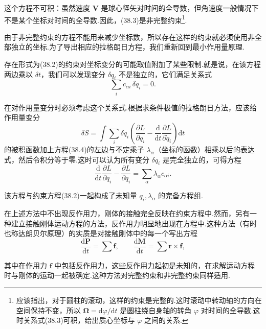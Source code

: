 这个方程不可积：虽然速度 $\boldsymbol{V}$ 是球心径矢对时间的全导数，但角速度一般情况下不是某个坐标对时间的全导数.因此，(38.3)是非完整约束\footnote{应该指出，对于圆柱的滚动，这样的约束是完整的.这时滚动中转动轴的方向在空间保持不变，所以 $\boldsymbol{\Omega}=\mathrm{d}\varphi/\mathrm{d}t$ 是圆柱绕自身轴的转角 $\varphi$ 对时间的全导数.这时关系式(38.3)可积，给出质心坐标与 $\varphi$ 之间的关系.}.

由于非完整约束的方程不能用来减少坐标数，所以存在这样的约束就必须使用非全部独立的坐标.为了导出相应的拉格朗日方程，我们重新回到最小作用量原理.

存在形式为(38.2)的约束对坐标变分的可能取值附加了某些限制.就是说，在该方程两边乘以 $\delta t$，我们可以发现变分 $\delta q_i$ 不是独立的，它们满足关系式
\begin{equation}
  \sum_i c_{\alpha i}\,\delta q_i=0.
\end{equation}

在对作用量变分时必须考虑这个关系式.根据求条件极值的拉格朗日方法，应该给作用量变分
\begin{equation*}
  \delta S=\int\sum_i\delta q_i
  \left(\frac{\partial L}{\partial q_i}
  -\frac{\mathrm{d}}{\mathrm{d}t}\frac{\partial L}{\partial\dot{q}_i}\right)
  \mathrm{d}t
\end{equation*}
的被积函数加上方程(38.4)的左边与不定乘子 $\lambda_\alpha$（坐标的函数）相乘以后的表达式，然后令积分等于零.这时可以认为所有变分 $\delta q_i$ 是完全独立的，可得方程
\begin{equation}
  \frac{\mathrm{d}}{\mathrm{d}t}\frac{\partial L}{\partial\dot{q}_i}
  -\frac{\partial L}{\partial q_i}
  =\sum_\alpha\lambda_\alpha c_{\alpha i}.
\end{equation}

该方程与约束方程(38.2)一起构成了未知量 $q_i,\lambda_\alpha$ 的完备方程组.

在上述方法中不出现反作用力，刚体的接触完全反映在约束方程中.然而，另有一种建立接触刚体运动方程的方法，反作用力明显地出现在方程中.这种方法（有时也称达朗贝尔原理）的实质是对接触刚体中的每一个写出方程
\begin{equation}
  \frac{\mathrm{d}\boldsymbol{P}}{\mathrm{d}t}=\sum\boldsymbol{f},
  \qquad
  \frac{\mathrm{d}\boldsymbol{M}}{\mathrm{d}t}
  =\sum\boldsymbol{r}\times\boldsymbol{f},
\end{equation}

其中在作用力 $\boldsymbol{f}$ 中包括反作用力，这些反作用力起初是未知的，在求解运动方程时与刚体的运动一起被确定.这种方法对完整约束和非完整约束同样适用.

